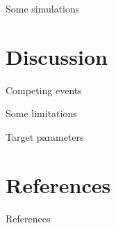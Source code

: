 \documentclass[smaller]{beamer}\usepackage{listings}
\begin{document}
\begin{frame}[label={sec:orgd85663d}]{Some simulations}
\end{frame}


\section{Discussion}
\label{sec:org3572dc2}
\begin{frame}[label={sec:orgb38e4cf}]{Competing events}
\end{frame}
\begin{frame}[label={sec:orgc78b2a7}]{Some limitations}
\end{frame}
\begin{frame}[label={sec:org69efebe}]{Target parameters}
\end{frame}


\section*{References}
\label{sec:orgb86e91c}
\begin{frame}[label={sec:org51fde96}]{References}
\footnotesize 
\end{frame}
\end{document}
